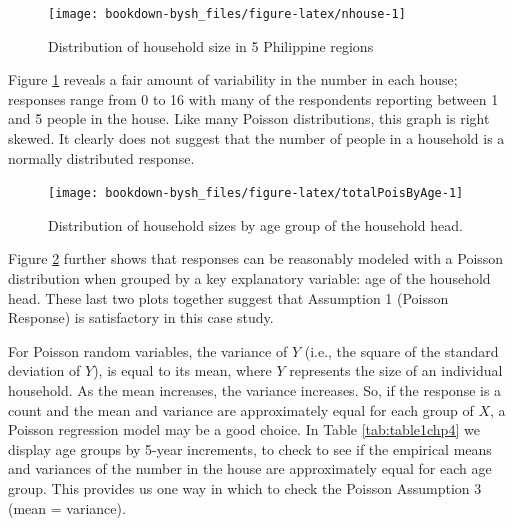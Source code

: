 \documentclass[
]{krantz}
\begin{document}
\begin{figure}

{\centering \texttt{[image: bookdown-bysh\_files/figure-latex/nhouse-1]} 

}

\caption{Distribution of household size in 5 Philippine regions}\label{fig:nhouse}
\end{figure}

Figure \ref{fig:nhouse} reveals a fair amount of variability in the number in each house; responses range from 0 to 16 with many of the respondents reporting between 1 and 5 people in the house. Like many Poisson distributions, this graph is right skewed. It clearly does not suggest that the number of people in a household is a normally distributed response.

\begin{figure}

{\centering \texttt{[image: bookdown-bysh\_files/figure-latex/totalPoisByAge-1]} 

}

\caption{Distribution of household sizes by age group of the household head.}\label{fig:totalPoisByAge}
\end{figure}

Figure \ref{fig:totalPoisByAge} further shows that responses can be reasonably modeled with a Poisson distribution when grouped by a key explanatory variable: age of the household head. These last two plots together suggest that Assumption 1 (Poisson Response) is satisfactory in this case study.

For Poisson random variables, the variance of \(Y\) (i.e., the square of the standard deviation of \(Y\)), is equal to its mean, where \(Y\) represents the size of an individual household. As the mean increases, the variance increases. So, if the response is a count and the mean and variance are approximately equal for each group of \(X\), a Poisson regression model may be a good choice. In Table \ref{tab:table1chp4} we display age groups by 5-year increments, to check to see if the empirical means and variances of the number in the house are approximately equal for each age group. This provides us one way in which to check the Poisson Assumption 3 (mean = variance).
\end{document}
